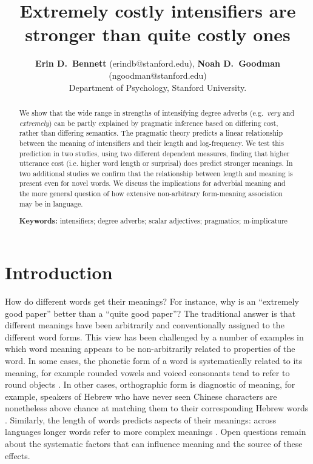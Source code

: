\documentclass[10pt,letterpaper]{article}
\title{Extremely costly intensifiers are stronger than quite costly ones}
\author{{\large \bf Erin D.~Bennett} (erindb@stanford.edu), {\large \bf Noah D.~Goodman} (ngoodman@stanford.edu)\\
  Department of Psychology, Stanford University.}
\newcommand{\w}[1]{\emph{#1}}
\begin{document}
\maketitle

\begin{abstract}

We show that the wide range in strengths of intensifying degree adverbs (e.g.~\w{very} and \w{extremely}) can be partly explained by pragmatic inference based on differing cost, rather than differing semantics.
The pragmatic theory predicts a linear relationship between the meaning of intensifiers and their length and log-frequency.
We test this prediction in two studies, using two different dependent measures, finding that higher utterance cost (i.e. higher word length or surprisal) does predict stronger meanings.
In two additional studies we confirm that the relationship between length and meaning is present even for novel words.
We discuss the implications for adverbial meaning and the more general question of how extensive non-arbitrary form-meaning association may be in language.

\textbf{Keywords:} 
intensifiers; degree adverbs; scalar adjectives; pragmatics; m-implicature
\end{abstract}

\section{Introduction}

How do different words get their meanings?
For instance, why is an ``extremely good paper'' better than a ``quite good paper''?
The traditional answer \cite{saussure} is that different meanings have been arbitrarily and conventionally assigned to the different word forms.
This view has been challenged by a number of examples in which word meaning appears to be non-arbitrarily related to properties of the word.
In some cases, the phonetic form of a word is systematically related to its meaning, for example rounded vowels and voiced consonants tend to refer to round objects \cite{maluma-takete, bouba-kiki, bouba-kiki2, takete-uloomo}.
In other cases, orthographic form is diagnostic of meaning, for example, speakers of Hebrew who have never seen Chinese characters are nonetheless above chance at matching them to their corresponding Hebrew words \cite{koriat}.
Similarly, the length of words predicts aspects of their meanings: across languages longer words refer to more complex meanings \cite{lewis}.
Open questions remain about the systematic factors that can influence meaning and the source of these effects.
\end{document}
